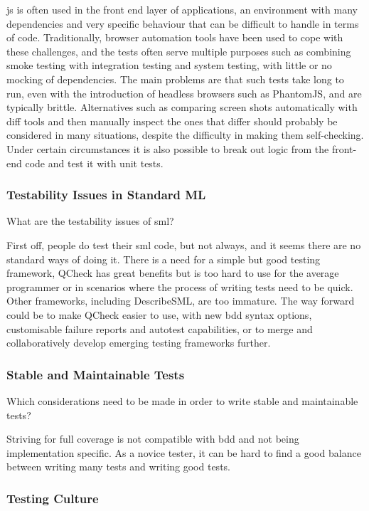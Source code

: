 \documentclass[11pt]{article}
\begin{document}
\Gls{js} is often used in the front end layer of applications, an environment with many dependencies and very specific behaviour that can be difficult to handle in terms of code. Traditionally, browser automation tools have been used to cope with these challenges, and the tests often serve multiple purposes such as combining smoke testing with integration testing and system testing, with little or no mocking of dependencies. The main problems are that such tests take long to run, even with the introduction of headless browsers such as PhantomJS, and are typically brittle. Alternatives such as comparing screen shots automatically with diff tools and then manually inspect the ones that differ should probably be considered in many situations, despite the difficulty in making them self-checking. Under certain circumstances it is also possible to break out logic from the front-end code and test it with unit tests.

\subsubsection{Testability Issues in Standard ML}
\label{subsubsec:whynotsml}

What are the testability issues of \gls{sml}?

First off, people do test their \gls{sml} code, but not always, and it seems there are no standard ways of doing it. There is a need for a simple but good testing framework, QCheck has great benefits but is too hard to use for the average programmer or in scenarios where the process of writing tests need to be quick. Other frameworks, including DescribeSML, are too immature. The way forward could be to make QCheck easier to use, with new \gls{bdd} syntax options, customisable failure reports and autotest capabilities, or to merge and collaboratively develop emerging testing frameworks further.

\subsubsection{Stable and Maintainable Tests}

Which considerations need to be made in order to write stable and maintainable tests?

Striving for full coverage is not compatible with \gls{bdd} and not being implementation specific. As a novice tester, it can be hard to find a good balance between writing many tests and writing good tests.

\subsubsection{Testing Culture}
\end{document}
